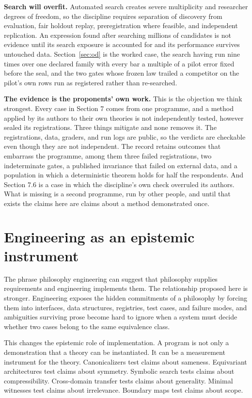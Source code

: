 \documentclass[11pt]{article}
\theoremstyle{remark}
\begin{document}
\textbf{Search will overfit.} Automated search creates severe multiplicity and
researcher degrees of freedom, so the discipline requires separation of discovery
from evaluation, fair holdout replay, preregistration where feasible, and
independent replication. An expression found after searching millions of candidates
is not evidence until its search exposure is accounted for and its performance
survives untouched data. Section~\ref{sec:od} is the worked case, the search having
run nine times over one declared family with every bar a multiple of a pilot error
fixed before the seal, and the two gates whose frozen law trailed a competitor on
the pilot's own rows run as registered rather than re-searched.

\textbf{The evidence is the proponents' own work.} This is the objection we think
strongest. Every case in Section 7 comes from one programme, and a method applied by
its authors to their own theories is not independently tested, however sealed its
registrations. Three things mitigate and none removes it. The registrations, data,
graders, and run logs are public, so the verdicts are checkable even though they are
not independent. The record retains outcomes that embarrass the programme, among
them three failed registrations, two indeterminate gates, a published invariance
that failed on external data, and a population in which a deterministic theorem
holds for half the respondents. And Section 7.6 is a case in which the discipline's
own check overruled its authors. What is missing is a second programme, run by other
people, and until that exists the claims here are claims about a method demonstrated
once.

\section{Engineering as an epistemic instrument}

The phrase philosophy engineering can suggest that philosophy supplies requirements
and engineering implements them. The relationship proposed here is stronger.
Engineering exposes the hidden commitments of a philosophy by forcing them into
interfaces, data structures, registries, test cases, and failure modes, and
ambiguities surviving prose become hard to ignore when a system must decide whether
two cases belong to the same equivalence class.

This changes the epistemic role of implementation. A program is not only a
demonstration that a theory can be instantiated. It can be a measurement instrument
for the theory. Canonicalizers test claims about sameness. Equivariant architectures
test claims about symmetry. Symbolic search tests claims about compressibility.
Cross-domain transfer tests claims about generality. Minimal witnesses test claims
about irrelevance. Boundary maps test claims about scope.
\end{document}

